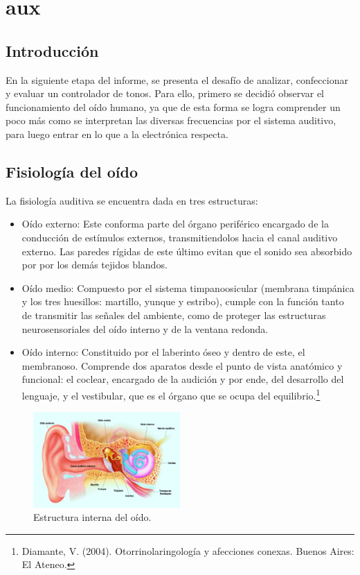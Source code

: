



\tableofcontents
\newpage

\section{aux}

\subsection{Introducción}

En la siguiente etapa del informe, se presenta el desafío de analizar, confeccionar y evaluar un controlador de tonos. Para ello, primero se decidió observar el funcionamiento del oído humano, ya que de esta forma se logra comprender un poco más como se interpretan las diversas frecuencias por el sistema auditivo, para luego entrar en lo que a la electrónica respecta.

\subsection{Fisiología del oído}

La fisiología auditiva se encuentra dada en tres estructuras:
\begin{itemize}
	\item Oído externo:
	Este conforma parte del órgano periférico encargado de la conducción de estímulos externos, transmitiendolos hacia el canal auditivo externo. Las paredes rígidas de este último evitan que el sonido sea absorbido por por los demás tejidos blandos.
	\item Oído medio:
	Compuesto por el sistema timpanoosicular (membrana timpánica y los tres huesillos: martillo, yunque y estribo), cumple con la función tanto de transmitir las señales del ambiente, como de proteger las estructuras neurosensoriales del oído interno y de la ventana redonda.
	\item Oído interno:
	Constituido por el laberinto óseo y dentro de este, el membranoso. Comprende dos aparatos desde el punto de vista anatómico y funcional: el coclear, encargado de la audición y por ende, del desarrollo del lenguaje, y el vestibular, que es el órgano que se ocupa del equilibrio.\footnote{Diamante, V. (2004). Otorrinolaringología y afecciones conexas. Buenos Aires: El Ateneo.}
\end{itemize}

\begin{figure}[H]
\centering
	\includegraphics[width=0.5\textwidth]{Imagenes/Partes-del-oido.png}
	\caption{Estructura interna del oído.}
	\label{fig:oido}
\end{figure}

